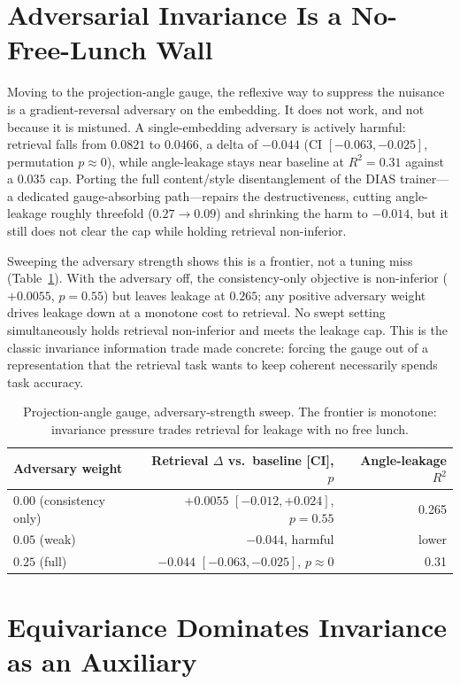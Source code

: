 \documentclass[11pt]{article}
\begin{document}
\section{Adversarial Invariance Is a No-Free-Lunch Wall}\label{sec:invariance}

Moving to the projection-angle gauge, the reflexive way to suppress the nuisance is a
gradient-reversal adversary on the embedding. It does not work, and not because it is mistuned. A
single-embedding adversary is actively harmful: retrieval falls from $0.0821$ to $0.0466$, a delta
of $-0.044$ (CI $[-0.063,-0.025]$, permutation $p\approx0$), while angle-leakage stays near baseline
at $R^2=0.31$ against a $0.035$ cap. Porting the full content/style disentanglement of the DIAS
trainer---a dedicated gauge-absorbing path---repairs the destructiveness, cutting angle-leakage
roughly threefold ($0.27\to0.09$) and shrinking the harm to $-0.014$, but it still does not clear the
cap while holding retrieval non-inferior.

Sweeping the adversary strength shows this is a frontier, not a tuning miss (Table~\ref{tab:sweep}).
With the adversary off, the consistency-only objective is non-inferior ($+0.0055$, $p=0.55$) but
leaves leakage at $0.265$; any positive adversary weight drives leakage down at a monotone cost to
retrieval. No swept setting simultaneously holds retrieval non-inferior and meets the leakage cap.
This is the classic invariance information trade made concrete: forcing the gauge out of a
representation that the retrieval task wants to keep coherent necessarily spends task accuracy.

\begin{table}[h]
\centering
\caption{Projection-angle gauge, adversary-strength sweep. The frontier is monotone: invariance
pressure trades retrieval for leakage with no free lunch.}
\label{tab:sweep}
\begin{tabular}{lrr}
\toprule
Adversary weight & Retrieval $\Delta$ vs.\ baseline [CI], $p$ & Angle-leakage $R^2$ \\
\midrule
$0.00$ (consistency only) & $+0.0055$ $[-0.012,+0.024]$, $p=0.55$ & 0.265 \\
$0.05$ (weak) & $-0.044$, harmful & lower \\
$0.25$ (full) & $-0.044$ $[-0.063,-0.025]$, $p\approx0$ & 0.31 \\
\bottomrule
\end{tabular}
\end{table}

\section{Equivariance Dominates Invariance as an Auxiliary}\label{sec:equivariance}
\end{document}
